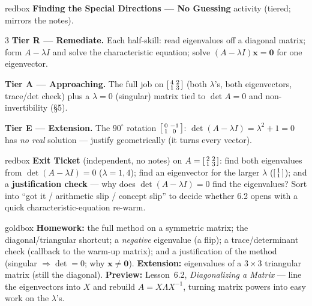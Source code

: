 \documentclass[10pt]{article}
\newcommand{\xx}{\mathbf{x}}
\newcommand{\zero}{\mathbf{0}}
\begin{document}
\begin{skillbox}{redbox}
\textbf{Finding the Special Directions --- No Guessing} activity (tiered; mirrors the notes).
\begin{multicols}{3}
\textbf{Tier R --- Remediate.} Each half-skill: read eigenvalues off a diagonal matrix; form
$A-\lambda I$ and solve the characteristic equation; solve $(A-\lambda I)\xx=\zero$ for one
eigenvector.

\columnbreak
\textbf{Tier A --- Approaching.} The full job on $\begin{bsmallmatrix}4&2\\1&3\end{bsmallmatrix}$
(both $\lambda$'s, both eigenvectors, trace/det check) plus a $\lambda=0$ (singular) matrix tied to
$\det A=0$ and non-invertibility (§5).

\columnbreak
\textbf{Tier E --- Extension.} The $90^\circ$ rotation $\begin{bsmallmatrix}0&-1\\1&0\end{bsmallmatrix}$:
$\det(A-\lambda I)=\lambda^2+1=0$ has \emph{no real} solution --- justify geometrically (it turns every
vector).
\end{multicols}
\end{skillbox}

\begin{skillbox}{redbox}
\textbf{Exit Ticket} (independent, no notes) on $A=\begin{bsmallmatrix}2&2\\1&3\end{bsmallmatrix}$:
find both eigenvalues from $\det(A-\lambda I)=0$ ($\lambda=1,4$); find an eigenvector for the larger
$\lambda$ ($\begin{bsmallmatrix}1\\1\end{bsmallmatrix}$); and a \textbf{justification check} --- why
does $\det(A-\lambda I)=0$ find the eigenvalues? Sort into ``got it / arithmetic slip / concept slip''
to decide whether 6.2 opens with a quick characteristic-equation re-warm.
\end{skillbox}

\begin{skillbox}{goldbox}
\textbf{Homework:} the full method on a symmetric matrix; the diagonal/triangular shortcut; a
\emph{negative} eigenvalue (a flip); a trace/determinant check (callback to the warm-up matrix); and a
justification of the method (singular $\Rightarrow\det=0$; why $\xx\ne\zero$). \textbf{Extension:}
eigenvalues of a $3\times3$ triangular matrix (still the diagonal). \textbf{Preview:} Lesson~6.2,
\emph{Diagonalizing a Matrix} --- line the eigenvectors into $X$ and rebuild $A=X\Lambda X^{-1}$,
turning matrix powers into easy work on the $\lambda$'s.
\end{skillbox}
\end{document}
